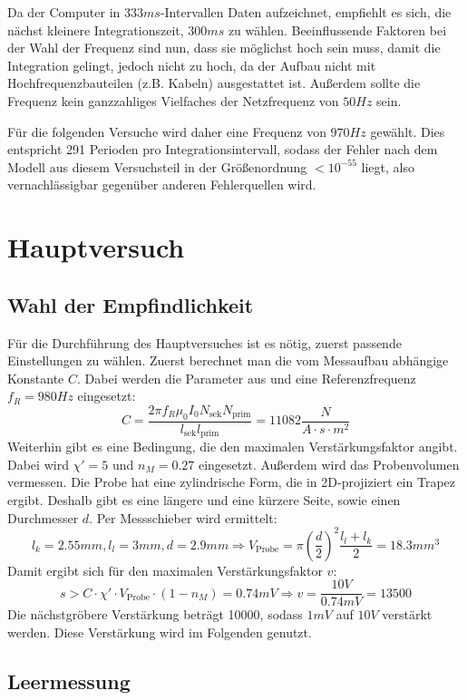 \documentclass{../Misc/MontavonLaTeX/Montavon}
\begin{document}
Da der Computer in $333 \unit{ms}$-Intervallen Daten aufzeichnet, empfiehlt es sich, die nächst kleinere Integrationszeit, $300 \unit{ms}$ zu wählen.
Beeinflussende Faktoren bei der Wahl der Frequenz sind nun, dass sie möglichst hoch sein muss, damit die Integration gelingt, jedoch nicht zu hoch, da der Aufbau nicht mit Hochfrequenzbauteilen (z.B. Kabeln) ausgestattet ist. Außerdem sollte die Frequenz kein ganzzahliges Vielfaches der Netzfrequenz von $50 \unit{Hz}$ sein.

Für die folgenden Versuche wird daher eine Frequenz von $970 \unit{Hz}$ gewählt. Dies entspricht 291 Perioden pro Integrationsintervall, sodass der Fehler nach dem Modell aus diesem Versuchsteil in der Größenordnung $< 10^{-55}$ liegt, also vernachlässigbar gegenüber anderen Fehlerquellen wird. 


\section{Hauptversuch}
\subsection{Wahl der Empfindlichkeit}
Für die Durchführung des Hauptversuches ist es nötig, zuerst passende Einstellungen zu wählen. Zuerst berechnet man die vom Messaufbau abhängige Konstante $C$. Dabei werden die Parameter aus \cite[S. 29]{anleitung} und eine Referenzfrequenz $f_R = 980 \unit{Hz}$ eingesetzt:
\[
	C = \frac{2 \pi f_R \mu_0 I_0 N_\textrm{sek} N_\textrm{prim}}{l_\textrm{sek} l_\textrm{prim}} = 11082 \unit{\frac{N}{A \cdot s \cdot m^2}}
\]
Weiterhin gibt es eine Bedingung, die den maximalen Verstärkungsfaktor angibt. Dabei wird $\chi' = 5$ und $n_M = 0.27$ eingesetzt. Außerdem wird das Probenvolumen vermessen. Die Probe hat eine zylindrische Form, die in 2D-projiziert ein Trapez ergibt. Deshalb gibt es eine längere und eine kürzere Seite, sowie einen Durchmesser $d$. Per Messschieber wird ermittelt:
\[
	l_k = 2.55 \unit{mm}, l_l = 3 \unit{mm}, d = 2.9 \unit{mm} \Rightarrow V_\textrm{Probe} = \pi \left(\frac{d}{2}\right)^2 \frac{l_l + l_k}{2} = 18.3 \unit{mm^3}
\]
Damit ergibt sich für den maximalen Verstärkungsfaktor $v$:
\[
	s > C \cdot \chi' \cdot V_\textrm{Probe} \cdot (1 - n_M) = 0.74 \unit{mV} \Rightarrow v = \frac{10 \unit{V}}{0.74 \unit{mV}} = 13500
\]
Die nächstgröbere Verstärkung beträgt 10000, sodass $1 \unit{mV}$ auf $10 \unit{V}$ verstärkt werden. Diese Verstärkung wird im Folgenden genutzt.

\subsection{Leermessung}
\end{document}
